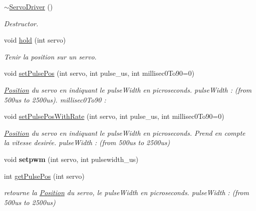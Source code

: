 \begin{DoxyCompactItemize}
\mbox{\label{classServoDriver_acf6cad7d5b891fbe4ff44eaec8409db7}} 
\hyperlink{classServoDriver_acf6cad7d5b891fbe4ff44eaec8409db7}{$\sim$\+Servo\+Driver} ()
\begin{DoxyCompactList}\small\item\em Destructor. \end{DoxyCompactList}\item 
\mbox{\label{classServoDriver_af580283b3d1765c9a27276e9a870cf88}} 
void \hyperlink{classServoDriver_af580283b3d1765c9a27276e9a870cf88}{hold} (int servo)
\begin{DoxyCompactList}\small\item\em Tenir la position sur un servo. \end{DoxyCompactList}\item 
\mbox{\label{classServoDriver_ae467a0069a2dbc63c7bbd845f64c22ec}} 
void \hyperlink{classServoDriver_ae467a0069a2dbc63c7bbd845f64c22ec}{set\+Pulse\+Pos} (int servo, int pulse\+\_\+us, int millisec0\+To90=0)
\begin{DoxyCompactList}\small\item\em \hyperlink{structPosition}{Position} du servo en indiquant le pulse\+Width en picroseconds. pulse\+Width \+: (from 500us to 2500us). millisec0\+To90 \+: \end{DoxyCompactList}\item 
\mbox{\label{classServoDriver_ac5f65b3e6eb75e1cd36314e5f1d012a6}} 
void \hyperlink{classServoDriver_ac5f65b3e6eb75e1cd36314e5f1d012a6}{set\+Pulse\+Pos\+With\+Rate} (int servo, int pulse\+\_\+us, int millisec0\+To90=0)
\begin{DoxyCompactList}\small\item\em \hyperlink{structPosition}{Position} du servo en indiquant le pulse\+Width en picroseconds. Prend en compte la vitesse desirée. pulse\+Width \+: (from 500us to 2500us) \end{DoxyCompactList}\item 
\mbox{\label{classServoDriver_a8e814adc1cec6f810bcd58ade3168c3d}} 
void {\bfseries setpwm} (int servo, int pulsewidth\+\_\+us)
\item 
int \hyperlink{classServoDriver_a716d64d7b2203c9cb8dff5c90d0a5dd9}{get\+Pulse\+Pos} (int servo)
\begin{DoxyCompactList}\small\item\em retourne la \hyperlink{structPosition}{Position} du servo, le pulse\+Width en picroseconds. pulse\+Width \+: (from 500us to 2500us) \end{DoxyCompactList}\item 

\end{DoxyCompactItemize}

